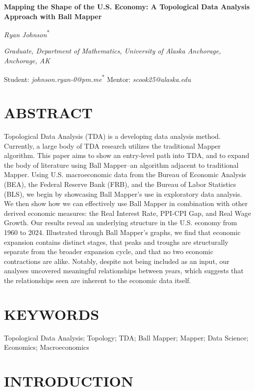 \documentclass[10pt, letterpaper]{article}
\begin{document}
{
\centering
{\fontsize{16}{19}\selectfont\textbf{Mapping the Shape of the U.S. Economy: A Topological Data Analysis Approach with Ball Mapper}}\par
\vspace{6pt}
}

\emph{Ryan Johnson}\textsuperscript{*}

\emph{Graduate, Department of Mathematics, University of Alaska
Anchorage, Anchorage, AK}

Student: \emph{johnson.ryan-0@pm.me}\textsuperscript{*} \newline Mentor:
\emph{scook25@alaska.edu}

\section{ABSTRACT}\label{abstract}

Topological Data Analysis (TDA) is a developing data analysis method.
Currently, a large body of TDA research utilizes the traditional Mapper
algorithm. This paper aims to show an entry-level path into TDA, and to
expand the body of literature using Ball Mapper--an algorithm adjacent
to traditional Mapper. Using U.S. macroeconomic data from the Bureau of
Economic Analysis (BEA), the Federal Reserve Bank (FRB), and the Bureau
of Labor Statistics (BLS), we begin by showcasing Ball Mapper's use in
exploratory data analysis. We then show how we can effectively use Ball
Mapper in combination with other derived economic measures: the Real
Interest Rate, PPI-CPI Gap, and Real Wage Growth. Our results reveal an
underlying structure in the U.S. economy from 1960 to 2024. Illustrated
through Ball Mapper's graphs, we find that economic expansion contains
distinct stages, that peaks and troughs are structurally separate from
the broader expansion cycle, and that no two economic contractions are
alike. Notably, despite not being included as an input, our analyses
uncovered meaningful relationships between years, which suggests that
the relationships seen are inherent to the economic data itself.

\section{KEYWORDS}\label{keywords}

Topological Data Analysis; Topology; TDA; Ball Mapper; Mapper; Data
Science; Economics; Macroeconomics

\section{INTRODUCTION}\label{introduction}
\end{document}
